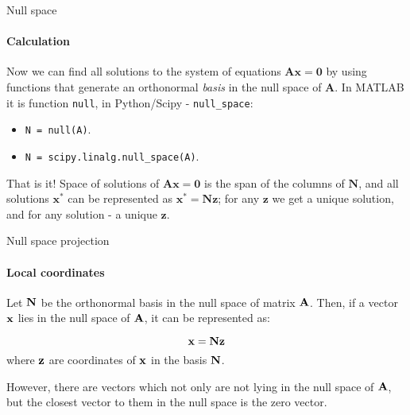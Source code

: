 \documentclass{beamer}
\begin{document}
\begin{frame}{Null space}
	\framesubtitle{Calculation}
	\begin{flushleft}
		
		Now we can find all solutions to the system of equations $\mathbf{A} \mathbf{x} = \mathbf{0}$ by using functions that generate an orthonormal \emph{basis} in the null space of $\mathbf{A}$. In MATLAB it is function \texttt{null}, in Python/Scipy - \texttt{null\_space}:
		
		\bigskip
		
		\begin{itemize}
			\item \texttt{N = null(A)}.
			\item \texttt{N = scipy.linalg.null\_space(A)}.
		\end{itemize}
		
		\bigskip
		
		That is it! Space of solutions of $\mathbf{A} \mathbf{x} = \mathbf{0}$ is the span of the columns of $\mathbf{N}$, and all solutions $\mathbf{x}^*$ can be represented as $\mathbf{x}^* = \mathbf{N}\mathbf{z}$; for any $\mathbf{z}$ we get a unique solution, and for any solution - a unique $\mathbf{z}$.
		
	\end{flushleft}
\end{frame}



\begin{frame}{Null space projection}
	\framesubtitle{Local coordinates}
	\begin{flushleft}
		
		Let $\mathbf{N}$ be the orthonormal basis in the null space of matrix $\mathbf{A}$. Then, if a vector $\mathbf{x}$ lies in the null space of $\mathbf{A}$, it can be represented as:
		
		\begin{equation}
			\mathbf{x} = \mathbf{N}\mathbf{z}
		\end{equation}
		where $\mathbf{z}$ are coordinates of $\mathbf{x}$ in the basis $\mathbf{N}$.
		
		\bigskip
		
		However, there are vectors which not only are not lying in the null space of $\mathbf{A}$,  but the closest vector to them in the null space is the zero vector.
		
	\end{flushleft}
\end{frame}
\end{document}
